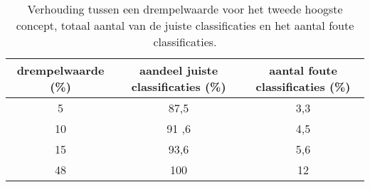 \begin{table}
	\renewcommand\arraystretch{1.2}
	\centering
	\begin{tabular}{*{3}{c}}
		\toprule
		drempelwaarde (\%) & aandeel juiste classificaties (\%) & aantal foute classificaties (\%) \\
		\midrule
		5 & 87,5 & 3,3 \\
		[\smallskipamount]
		10 & 91 ,6& 4,5 \\
		[\smallskipamount]
		15 & 93,6 & 5,6 \\
		[\smallskipamount]
		48 & 100 & 12 \\
		\bottomrule
	\end{tabular}
	\caption[Verhouding tussen drempelwaarde tweede concept, aantal juiste classificaties en foutenmarge]{Verhouding tussen een drempelwaarde voor het tweede hoogste concept, totaal aantal van de juiste classificaties en het aantal foute classificaties.}
	\label{tab:drempelwaarde-custom-tag2}
\end{table}

